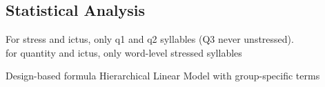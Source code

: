 \subsection{Statistical Analysis} 

For stress and ictus, only q1 and q2 syllables (Q3 never unstressed). \\
for quantity and ictus, only word-level stressed syllables



Design-based formula
Hierarchical Linear Model with group-specific terms

\cite{goodrichRstanarmBayesianApplied2020,brillemanJointLongitudinalTimetoevent2018}
